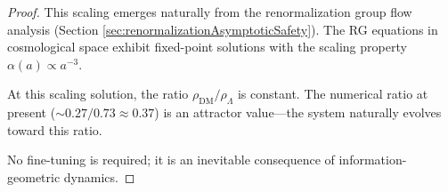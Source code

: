 \begin{theorem}
\begin{proof}
This scaling emerges naturally from the renormalization group flow analysis (Section \ref{sec:renormalizationAsymptoticSafety}). The RG equations in cosmological space exhibit fixed-point solutions with the scaling property $\alpha(a) \propto a^{-3}$.

At this scaling solution, the ratio $\rho_{\text{DM}} / \rho_\Lambda$ is constant. The numerical ratio at present ($\sim 0.27 / 0.73 \approx 0.37$) is an attractor value---the system naturally evolves toward this ratio.

No fine-tuning is required; it is an inevitable consequence of information-geometric dynamics.

\end{proof}

\end{theorem}

